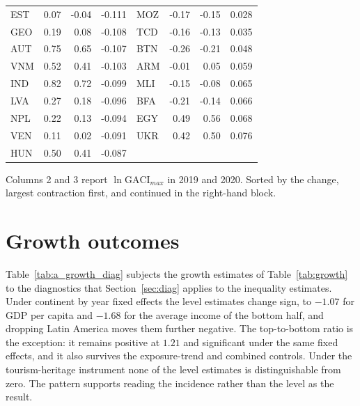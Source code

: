 \begin{table}[H]
\begin{threeparttable}
\begin{tabular}{lrrr@{\hskip 2em}lrrr}
EST & 0.07 & -0.04 & -0.111 & MOZ & -0.17 & -0.15 & 0.028 \\
GEO & 0.19 & 0.08 & -0.108 & TCD & -0.16 & -0.13 & 0.035 \\
AUT & 0.75 & 0.65 & -0.107 & BTN & -0.26 & -0.21 & 0.048 \\
VNM & 0.52 & 0.41 & -0.103 & ARM & -0.01 & 0.05 & 0.059 \\
IND & 0.82 & 0.72 & -0.099 & MLI & -0.15 & -0.08 & 0.065 \\
LVA & 0.27 & 0.18 & -0.096 & BFA & -0.21 & -0.14 & 0.066 \\
NPL & 0.22 & 0.13 & -0.094 & EGY & 0.49 & 0.56 & 0.068 \\
VEN & 0.11 & 0.02 & -0.091 & UKR & 0.42 & 0.50 & 0.076 \\
HUN & 0.50 & 0.41 & -0.087 &  & & &  \\
\bottomrule
\end{tabular}
\begin{tablenotes}\scriptsize\item Columns 2 and 3 report $\ln\mathrm{GACI}_{max}$ in 2019 and 2020. Sorted by the change, largest contraction first, and continued in the right-hand block.\end{tablenotes}\end{threeparttable}\end{table}

\section{Growth outcomes}
\label{app:growth}
Table~\ref{tab:a_growth_diag} subjects the growth estimates of Table~\ref{tab:growth} to the diagnostics that Section~\ref{sec:diag} applies to the inequality estimates. Under continent by year fixed effects the level estimates change sign, to $-1.07$ for GDP per capita and $-1.68$ for the average income of the bottom half, and dropping Latin America moves them further negative. The top-to-bottom ratio is the exception: it remains positive at $1.21$ and significant under the same fixed effects, and it also survives the exposure-trend and combined controls. Under the tourism-heritage instrument none of the level estimates is distinguishable from zero. The pattern supports reading the incidence rather than the level as the result.

